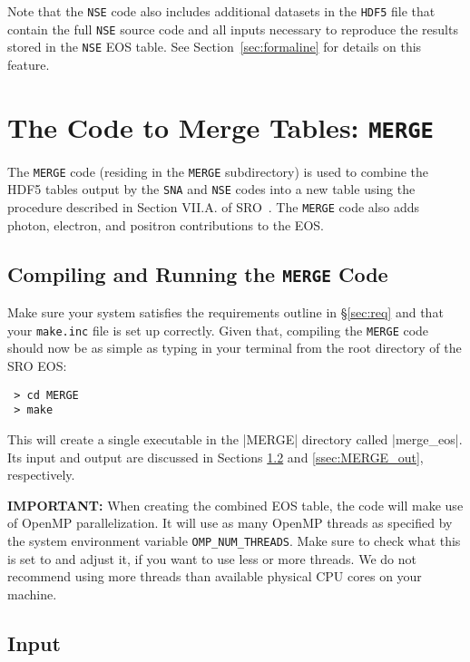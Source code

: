 \documentclass[letterpaper,11pt]{refart}
\begin{document}
\smallskip
Note that the \texttt{NSE} code also includes additional datasets in
the \texttt{HDF5} file that contain the full \texttt{NSE} source code
and all inputs necessary to reproduce the results stored in the
\texttt{NSE} EOS table. See Section~\ref{sec:formaline} for details on
this feature.


\section{The Code to Merge Tables: \texttt{MERGE}}
\label{sec:merge}


The \texttt{MERGE} code (residing in the \texttt{MERGE} subdirectory) 
is used to combine the HDF5 tables output by the \texttt{SNA} and 
\texttt{NSE} codes into a new table using the procedure described
in Section VII.A. of SRO~\cite{schneider:17}. The \texttt{MERGE} code
also adds photon, electron, and positron contributions to the EOS.


\subsection{Compiling and Running the \texttt{MERGE} Code}


Make sure your system satisfies the requirements outline in
\S\ref{sec:req} and that your \texttt{make.inc} file is set up
correctly. Given that, compiling the \verb|MERGE| code should now be
as simple as typing in your terminal from the root directory of the
SRO EOS:

\begin{verbatim}
 > cd MERGE
 > make
\end{verbatim}


This will create a single executable in the \verbfile|MERGE| 
directory called \verbexec|merge_eos|.  Its input and output are
discussed in Sections \ref{ssec:MERGE_in} and \ref{ssec:MERGE_out},
respectively. 


\textbf{IMPORTANT:} When creating the combined EOS table, the code
will make use of OpenMP parallelization. It will use as many OpenMP
threads as specified by the system environment variable
\texttt{OMP\_NUM\_THREADS}. Make sure to check what this is set to and
adjust it, if you want to use less or more threads. We do not
recommend using more threads than available physical CPU cores on your
machine.


\subsection{Input}
\label{ssec:MERGE_in}
\end{document}
